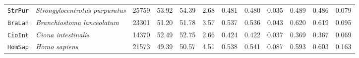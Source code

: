 \begin{table}
\begin{tabular}{llrrrrrrrrrr}
    \texttt{StrPur} & \textit{Strongylocentrotus purpuratus} & \num{25759} & 53.92 & 54.39 & 2.68 & 0.481 & 0.480 & 0.035 & 0.489 & 0.486 & 0.079 \\
    \texttt{BraLan} & \textit{Branchiostoma lanceolatum}     & \num{23301} & 51.20 & 51.78 & 3.57 & 0.537 & 0.536 & 0.043 & 0.620 & 0.619 & 0.095 \\
    \texttt{CioInt} & \textit{Ciona intestinalis}            & \num{14370} & 52.49 & 52.75 & 2.66 & 0.424 & 0.422 & 0.037 & 0.369 & 0.367 & 0.069 \\
    \texttt{HomSap} & \textit{Homo sapiens}                  & \num{21573} & 49.39 & 50.57 & 4.51 & 0.538 & 0.541 & 0.087 & 0.593 & 0.603 & 0.163 \\
    \bottomrule
    \end{tabular}
\end{table}

